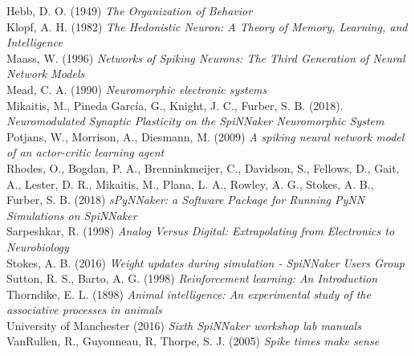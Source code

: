\documentclass[10pt]{article}
\begin{document}
    \noindent
    Hebb, D. O. (1949) \textit{The Organization of Behavior} \\[-3pt]

    \noindent    
    Klopf, A. H. (1982) \textit{The Hedonistic Neuron: A Theory of Memory, Learning, and Intelligence} \\[-3pt]

    \noindent
    Maass, W. (1996) \textit{Networks of Spiking Neurons: The Third Generation of Neural Network Models} \\[-3pt]

    \noindent
    Mead, C. A. (1990) \textit{Neuromorphic electronic systems} \\[-3pt]

    \noindent
    Mikaitis, M., Pineda García, G., Knight, J. C., Furber, S. B. (2018).  \textit{Neuromodulated Synaptic Plasticity on the SpiNNaker Neuromorphic System} \\[-3pt]

    \noindent
    Potjans, W., Morrison, A., Diesmann, M. (2009) \textit{A spiking neural network model of an actor-critic learning agent} \\[-3pt]

    \noindent
    Rhodes, O., Bogdan, P. A., Brenninkmeijer, C., Davidson, S., Fellows, D., Gait, A., Lester, D. R., Mikaitis, M., Plana, L. A., Rowley, A. G., Stokes, A. B., Furber, S. B. (2018) \textit{sPyNNaker: a Software Package for Running PyNN
    Simulations on SpiNNaker} \\[-3pt]

    \noindent
    Sarpeshkar, R. (1998) \textit{Analog Versus Digital: Extrapolating from Electronics to Neurobiology} \\[-3pt]

    \noindent
    Stokes, A. B. (2016) \textit{Weight updates during simulation - SpiNNaker Users Group} \\[-3pt]

    \noindent
    Sutton, R. S., Barto, A. G. (1998) \textit{Reinforcement learning: An Introduction} \\[-3pt]

    \noindent
    Thorndike, E. L. (1898) \textit{Animal intelligence: An experimental study of the associative processes in animals} \\[-3pt]

    \noindent
    University of Manchester (2016) \textit{Sixth SpiNNaker workshop lab manuals} \\[-3pt]

    \noindent
    VanRullen, R., Guyonneau, R, Thorpe, S. J. (2005) \textit{Spike times make sense} \\[-3pt]
    
    
\end{document}
